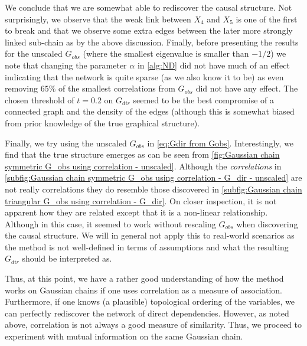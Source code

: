 \documentclass[../Thesis.tex]{subfiles}
\begin{document}
We conclude that we are somewhat able to rediscover the causal structure. Not surprisingly, we observe that the weak link between $X_4$ and $X_5$ is one of the first to break and that we observe some extra edges between the later more strongly linked sub-chain as by the above discussion. Finally, before presenting the results for the unscaled $G_{obs}$ (where the smallest eigenvalue is smaller than $-1/2$) we note that changing the parameter $\alpha$ in \autoref{alg:ND} did not have much of an effect indicating that the network is quite sparse (as we also know it to be) as even removing $65\%$ of the smallest correlations from $G_{obs}$ did not have any effect. The chosen threshold of $t=0.2$ on $G_{dir}$ seemed to be the best compromise of a connected graph and the density of the edges (although this is somewhat biased from prior knowledge of the true graphical structure).

Finally, we try using the unscaled $G_{obs}$ in \autoref{eq:Gdir from Gobs}. Interestingly, we find that the true structure emerges as can be seen from \autoref{fig:Gaussian chain symmetric G_obs using correlation - unscaled}. Although the \textit{correlations} in \autoref{subfig:Gaussian chain symmetric G_obs using correlation - G_dir - unscaled} are not really correlations they do resemble those discovered in \autoref{subfig:Gaussian chain triangular G_obs using correlation - G_dir}. On closer inspection, it is not apparent how they are related except that it is a non-linear relationship. Although in this case, it seemed to work without rescaling $G_{obs}$ when discovering the causal structure. We will in general not apply this to real-world scenarios as the method is not well-defined in terms of assumptions and what the resulting $G_{dir}$ should be interpreted as.


Thus, at this point, we have a rather good understanding of how the method works on Gaussian chains if one uses correlation as a measure of association. Furthermore, if one knows (a plausible) topological ordering of the variables, we can perfectly rediscover the network of direct dependencies. However, as noted above, correlation is not always a good measure of similarity. Thus, we proceed to experiment with mutual information on the same Gaussian chain.
\end{document}
